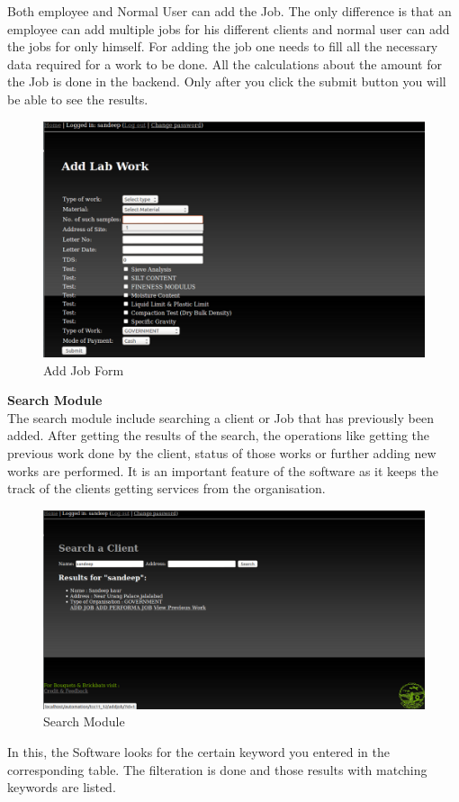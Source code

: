 Both employee and Normal User can add the Job. The only difference is 
that an employee can add multiple jobs for his different clients and 
normal user can add the jobs for only himself. For adding the job one 
needs to fill all the necessary data required for a work to be done.
All the calculations about the amount for the Job is done in the backend. 
Only after you click the submit button you will be able to see the 
results.
\begin{figure}[h]
\vskip 2cm
\centering \includegraphics[scale=1.0]{images/addjob1.png}
\caption{Add Job Form}
\end{figure}

\newpage
{\bf Search Module}\\

The search module include searching a client or Job that has previously 
been added. After getting the results of the search, the operations 
like getting the previous work done by the client, status of those works 
or further adding new works are performed. It is an important feature 
of the software as it keeps the track of the clients getting services 
from the organisation.

\begin{figure}[h]
\vskip 2cm
\centering \includegraphics[scale=1.0]{images/search1.png}
\caption{Search Module}
\end{figure}
In this, the Software looks for the certain keyword you entered in the 
corresponding table. The filteration is done and those results with 
matching keywords are listed. 


